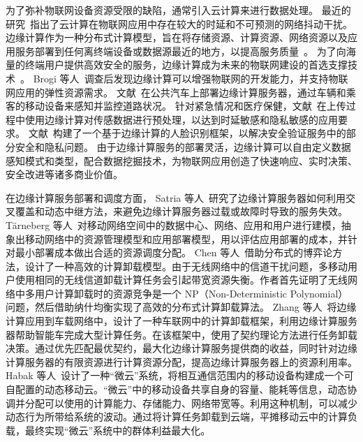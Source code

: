 为了弥补物联网设备资源受限的缺陷，通常引入云计算来进行数据处理。
最近的研究~\cite{DBLP:journals/iotj/RazzaqueMPC16}指出了云计算在物联网应用中存在较大的时延和不可预测的网络抖动干扰。
边缘计算作为一种分布式计算模型，旨在将存储资源、计算资源、网络资源以及应用服务部署到任何离终端设备或数据源最近的地方，以提高服务质量~\cite{AI201877}。
为了向海量的终端用户提供高效安全的服务，边缘计算成为未来的物联网建设的首选支撑技术~\cite{DBLP:journals/iotj/LinYZYZZ17}。
Brogi 等人~\cite{DBLP:Journals/IOTj/BroGif17}调查后发现边缘计算可以增强物联网的开发能力，并支持物联网应用的弹性资源需求。
文献~在公共汽车上部署边缘计算服务器，通过车辆和乘客的移动设备来感知并监控道路状况。
针对紧急情况和医疗保健，文献~在上传过程中使用边缘计算对传感数据进行预处理，以达到时延敏感和隐私敏感的应用要求。
文献~构建了一个基于边缘计算的人脸识别框架，以解决安全验证服务中的部分安全和隐私问题。
由于边缘计算服务的部署灵活，边缘计算可以自由定义数据感知模式和类型，配合数据挖掘技术，为物联网应用创造了快速响应、实时决策、安全改进等诸多商业价值。

在边缘计算服务部署和调度方面，
Satria 等人~\cite{DBLP:journals/fgcs/SatriaPJ17}研究了边缘计算服务器如何利用交叉覆盖和动态中继方法，来避免边缘计算服务器过载或故障时导致的服务失效。
T{\"{a}}rneberg 等人~\cite{DBLP:journals/fgcs/TarnebergMWTEKE17}对移动网络空间中的数据中心、网络、应用和用户进行建模，抽象出移动网络中的资源管理模型和应用部署模型，用以评估应用部署的成本，并针对最小部署成本做出合适的资源调度分配。
Chen 等人~\cite{DBLP:journals/ton/ChenJLF16}借助分布式的博弈论方法，设计了一种高效的计算卸载模型。由于无线网络中的信道干扰问题，多移动用户使用相同的无线信道卸载计算任务会引起带宽资源失衡。作者首先证明了无线网络中多用户计算卸载时的资源竞争是一个 NP（Non-Deterministic Polynomial）问题，然后借助纳什均衡实现了高效的分布式计算卸载算法。
Zhang 等人~\cite{DBLP:conf/rndm/ZhangMLV016}将边缘计算应用到车载网络中，设计了一种车联网中的计算卸载框架，利用边缘计算服务器帮助智能车完成大型计算任务。在该框架中，使用了契约理论方法进行任务卸载决策。通过优先匹配最优契约，最大化边缘计算服务提供商的收益，同时针对边缘计算服务器的有限资源进行计算资源分配，提高边缘计算服务器上的资源利用率。
Habak 等人~\cite{DBLP:conf/IEEEcloud/HabakAHZ15}设计了一种“微云”系统，将相互通信范围内的移动设备构建成一个可自配置的动态移动云。“微云”中的移动设备共享自身的容量、能耗等信息，动态协调并分配可以使用的计算能力、存储能力、网络带宽等。利用这种机制，可以减少动态行为所带给系统的波动。通过将计算任务卸载到云端，平摊移动云中的计算负载，最终实现“微云”系统中的群体利益最大化。


